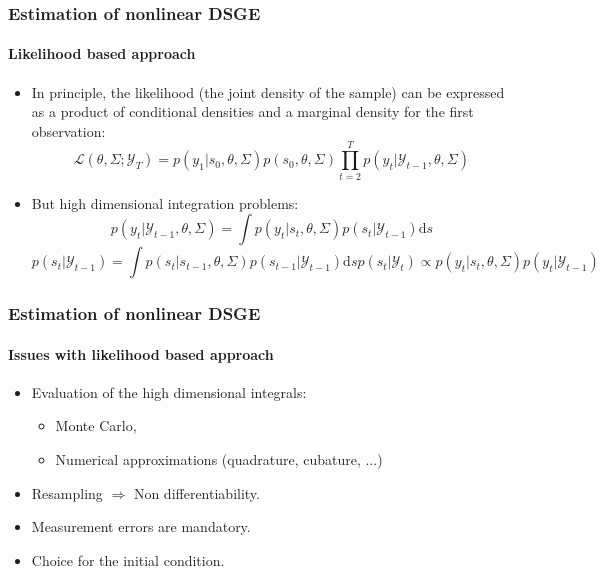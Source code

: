 \documentclass[10pt]{beamer}
\begin{document}
\begin{frame}
\frametitle{Estimation of nonlinear DSGE}
\framesubtitle{Likelihood based approach}

\begin{itemize}
\item In principle, the likelihood (the joint density of the sample) can be expressed as a product of conditional densities and a marginal density for the first observation:
  \[
    \mathcal L(\theta,\Sigma; \mathcal Y_T) = p(y_1|s_0, \theta, \Sigma)p(s_0, \theta, \Sigma)\prod_{t=2}^Tp(y_t|\mathcal Y_{t-1}, \theta, \Sigma)
  \]
  \bigskip
\item But high dimensional integration problems:
  \[
    p(y_t|\mathcal Y_{t-1}, \theta, \Sigma) = \int p(y_t|s_t, \theta, \Sigma)p(s_t|\mathcal Y_{t-1})\mathrm ds
  \]
  \begin{subequations}
    \begin{equation}
      \tag{Prediction}
      p(s_t|\mathcal Y_{t-1}) = \int p(s_t|s_{t-1},\theta,\Sigma)p(s_{t-1}|\mathcal Y_{t-1})\mathrm ds
    \end{equation}
    \begin{equation}
      \tag{Update, Bayes}
      p(s_{t}|\mathcal Y_{t}) \propto p(y_t|s_t,\theta,\Sigma)p(y_t|\mathcal Y_{t-1})
    \end{equation}
  \end{subequations}

\end{itemize}
\end{frame}


\begin{frame}
\frametitle{Estimation of nonlinear DSGE}
\framesubtitle{Issues with likelihood based approach}

\bigskip
\bigskip
  
\begin{itemize}

\item Evaluation of the high dimensional integrals:\newline

  \begin{itemize}
  \item Monte Carlo,
  \item Numerical approximations (quadrature, cubature, ...)
  \end{itemize}

  \bigskip

\item Resampling $\Rightarrow$ Non differentiability.\newline

  \bigskip

\item Measurement errors are mandatory.\newline

  \bigskip
  
\item Choice for the initial condition.
  
\end{itemize}

\end{frame}
\end{document}
